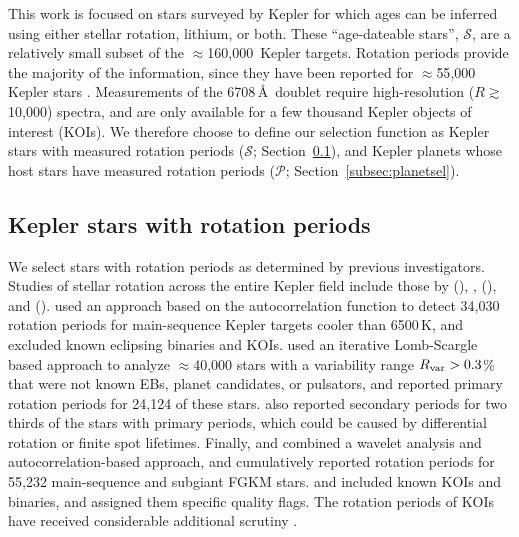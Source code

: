 \documentclass[11pt,twocolumn,tighten]{aastex63}
\newcommand{\nkeplerstars}{$\approx$160{,}000}
\begin{document}
This work is focused on stars surveyed by Kepler for which ages can be
inferred using either stellar rotation, lithium, or both.  These
``age-dateable stars'', $\mathcal{S}$, are a relatively small subset
of the \nkeplerstars\ Kepler targets.  Rotation periods provide
the majority of the information, since they have been reported for
$\approx$55{,}000 Kepler stars
\citep[e.g.][]{McQuillan_2014,Santos_2021}.  Measurements of the
 6708\,\AA\ doublet require high-resolution
($R\gtrsim$10{,}000) spectra, and are only available for a few
thousand Kepler objects of interest (KOIs).  We therefore choose to
define our selection function as Kepler stars with measured
rotation periods ($\mathcal{S}$; Section~\ref{subsec:starsel}), and
Kepler planets whose host stars have measured rotation periods
($\mathcal{P}$; Section~\ref{subsec:planetsel}).


\subsection{Kepler stars with rotation periods}
\label{subsec:starsel}

We select stars with rotation periods as determined by previous
investigators.  Studies of stellar rotation across the entire Kepler field
include those by \citet{McQuillan_2014} (),
\citet{Reinhold_2015},
\citet{Santos_2019} (), and
\citet{Santos_2021} ().
 used an approach
based on the autocorrelation function to detect 34{,}030 rotation
periods for main-sequence Kepler targets cooler than 6500\,K, and excluded
known eclipsing binaries and KOIs.  
\citet{Reinhold_2015} used an iterative Lomb-Scargle based approach to
analyze $\approx$40{,}000 stars with a variability range $R_{\rm
	var}>0.3$\% that were not known EBs, planet candidates, or pulsators,
and reported primary rotation periods for 24{,}124 of these stars.
\citet{Reinhold_2015} also reported secondary periods for two thirds
of the stars with primary periods, which could be caused by
differential rotation or finite spot lifetimes.  
Finally,
 and
 combined a wavelet analysis and
autocorrelation-based approach, and cumulatively reported rotation
periods for 55{,}232 main-sequence and subgiant FGKM stars.
 and  included known
KOIs and binaries, and assigned them specific quality flags.  
The rotation periods of KOIs have received considerable additional
scrutiny
\citep[e.g.][]{Walkowicz_2013,Mazeh_2015,Angus_2018,David_2021}.
\end{document}
